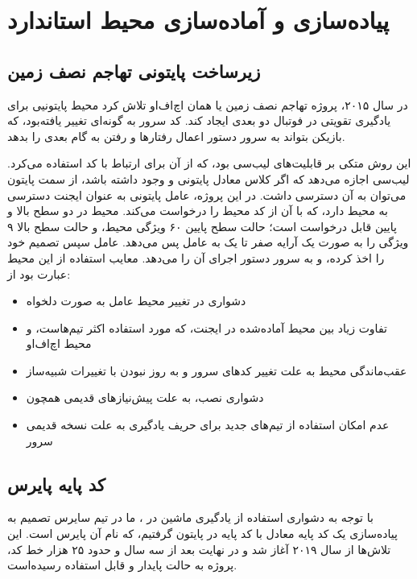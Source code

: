 \chapter{پیاده‌سازی و آماده‌سازی محیط استاندارد}
\section{زیرساخت پایتونی تهاجم نصف زمین}
در سال ۲۰۱۵، 
پروژه تهاجم نصف زمین  یا همان اچ‌اف‌او
تلاش کرد محیط پایتونیی برای یادگیری تقویتی در فوتبال دو بعدی ایجاد کند.
کد سرور به گونه‌ای تغییر یافته‌بود، که بازیکن بتواند به سرور دستور اعمال رفتار‌ها و رفتن به گام بعدی را بدهد.

این روش متکی بر قابلیت‌های لیب‌سی  بود، که از آن برای ارتباط با کد  استفاده می‌کرد.
لیب‌سی اجازه می‌دهد که اگر کلاس معادل پایتونی و  وجود داشته باشد،
از سمت پایتون می‌توان به آن دسترسی داشت.
در این پروژه، عامل پایتونی به عنوان ایجنت دسترسی به محیط دارد، که با آن از کد  محیط را درخواست می‌کند.
محیط در دو سطح بالا و پایین قابل درخواست است؛ حالت سطح پایین ۶۰ ویژگی محیط، و حالت سطح بالا ۹ ویژگی را به صورت یک آرایه صفر تا یک به عامل پس می‌دهد.
عامل سپس تصمیم خود را اخذ کرده، و به سرور دستور اجرای آن را می‌دهد.
معایب استفاده از این محیط عبارت بود از:
\begin{itemize}
    \item دشواری در تغییر محیط عامل به صورت دلخواه
    \item تفاوت زیاد بین محیط آماده‌شده در ایجنت، که مورد استفاده اکثر تیم‌هاست، و محیط اچ‌اف‌او
    \item عقب‌ماندگی محیط به علت تغییر کد‌های سرور و به روز نبودن با تغییرات شبیه‌ساز
    \item دشواری نصب، به علت پیش‌نیاز‌های قدیمی همچون 
    \item عدم امکان استفاده از تیم‌های جدید برای حریف یادگیری به علت نسخه قدیمی سرور
\end{itemize}
\section{کد پایه پایرس}
با توجه به دشواری استفاده از یادگیری ماشین در ،
ما در تیم سایرس تصمیم به پیاده‌سازی یک کد پایه معادل با کد پایه 
در پایتون گرفتیم، که نام آن پایرس  است.\cite{Pyrus2D}
این تلاش‌ها از سال ۲۰۱۹ آغاز شد و در نهایت بعد از سه سال و حدود ۲۵ هزار خط کد، پروژه به حالت پایدار و قابل استفاده رسیده‌است.

